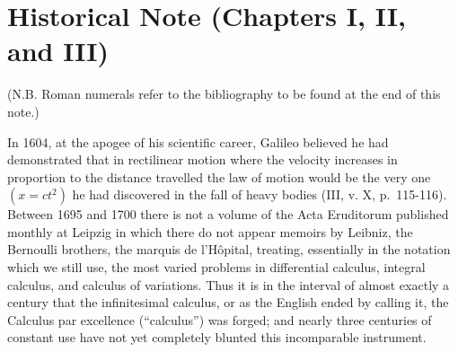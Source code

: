 \section*{Historical Note (Chapters I, II, and III)}
{}

(N.B. Roman numerals refer to the bibliography to be found at the end of this note.)

In 1604, at the apogee of his scientific career, Galileo believed he had demonstrated that in rectilinear motion where the velocity increases in proportion to the distance travelled the law of motion would be the very one \((x = ct^{2})\) he had discovered in the fall of heavy bodies (III, v. X, p.~115-116). Between 1695 and 1700 there is not a volume of the Acta Eruditorum published monthly at Leipzig in which there do not appear memoirs by Leibniz, the Bernoulli brothers, the marquis de l'Hôpital, treating, essentially in the notation which we still use, the most varied problems in differential calculus, integral calculus, and calculus of variations. Thus it is in the interval of almost exactly a century that the infinitesimal calculus, or as the English ended by calling it, the Calculus par excellence (``calculus'') was forged; and nearly three centuries of constant use have not yet completely blunted this incomparable instrument.


